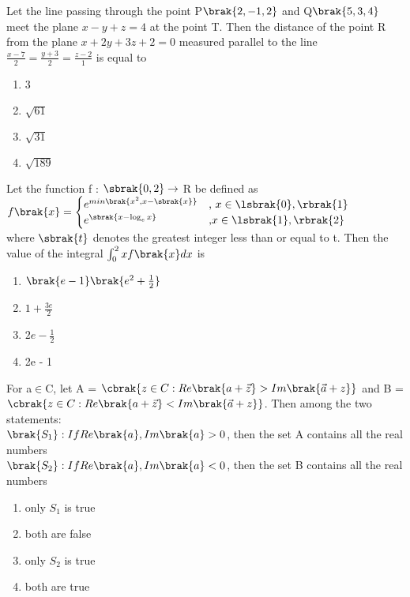 \iffalse
\title{Assignment-5}
\author{EE24BTECH11048-NITHIN.K}
\section{mcq-single}
\fi
\item Let the line passing through the point P$\brak{2,-1,2}$ and Q$\brak{5,3,4}$ meet the plane $x-y+z=4$ at the point T. Then the distance of the point R from the plane $x+2y+3z+2=0$ measured parallel
to the line $\frac{x-7}{2} = \frac{y+3}{2} = \frac{z-2}{1}$ is equal to
\begin{enumerate}
\item 3
\item $\sqrt{61}$
\item $\sqrt{31}$
\item $\sqrt{189}$
\end{enumerate}

\item Let the function f : $\sbrak{0,2} \rightarrow$ R be defined as \\
	$f\brak{x} = \begin{cases} e^{min\brak{x^2,x-\sbrak{x}}} & \text{, } x \in \lsbrak{0},\rbrak{1} \\ e^{\sbrak{x-\log_e{x}}} & \text{,} x \in \lsbrak{1},\rbrak{2} \end{cases}$ \\
		where $\sbrak{t}$ denotes the greatest integer less than or equal to t. Then the value of the integral $\int_{0}^{2}xf\brak{x}dx$ is
\begin{enumerate}
\item $\brak{e-1}\brak{e^2+\frac{1}{2}}$
\item $1+\frac{3e}{2}$
\item $2e-\frac{1}{2}$
\item 2e - 1
\end{enumerate}

\item For a$\in$C, let A = $\cbrak{z\in C:Re\brak{a+\vec{z}} > Im\brak{\vec{a}+z}}$ and B = $\cbrak{z\in C:Re\brak{a+\vec{z}} < Im\brak{\vec{a}+z}}$. Then among the two statements: \\
$\brak{S_1} : If Re\brak{a}, Im\brak{a} > 0$, then the set A contains all the real numbers \\
$\brak{S_2} : If Re\brak{a}, Im\brak{a} < 0$, then the set B contains all the real numbers
\begin{enumerate}
\item only $S_1$ is true
\item both are false
\item only $S_2$ is true
\item both are true
\end{enumerate}

